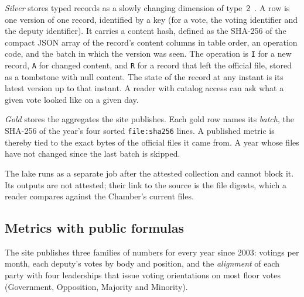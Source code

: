 \emph{Silver} stores typed records as a slowly changing dimension of type~2~\citep{kimball2013toolkit}. A row is one version of one record, identified by a key (for a vote, the voting identifier and the deputy identifier). It carries a content hash, defined as the SHA-256 of the compact JSON array of the record's content columns in table order, an operation code, and the batch in which the version was seen. The operation is \texttt{I} for a new record, \texttt{A} for changed content, and \texttt{R} for a record that left the official file, stored as a tombstone with null content. The state of the record at any instant is its latest version up to that instant. A reader with catalog access can ask what a given vote looked like on a given day.

\emph{Gold} stores the aggregates the site publishes. Each gold row names its \emph{batch}, the SHA-256 of the year's four sorted \texttt{file:sha256} lines. A published metric is thereby tied to the exact bytes of the official files it came from. A year whose files have not changed since the last batch is skipped.

The lake runs as a separate job after the attested collection and cannot block it. Its outputs are not attested; their link to the source is the file digests, which a reader compares against the Chamber's current files.

\subsection{Metrics with public formulas}
\label{sec:metrics}

The site publishes three families of numbers for every year since 2003: votings per month, each deputy's votes by body and position, and the \emph{alignment} of each party with four leaderships that issue voting orientations on most floor votes (Government, Opposition, Majority and Minority).

